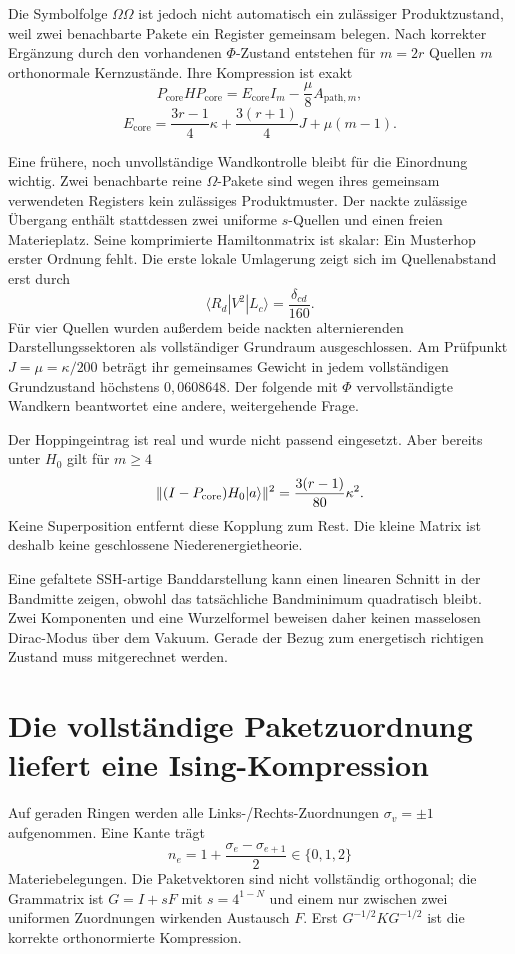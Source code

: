 Die Symbolfolge $\Omega\Omega$ ist jedoch nicht automatisch ein zulässiger Produktzustand, weil zwei benachbarte Pakete ein Register gemeinsam belegen. Nach korrekter Ergänzung durch den vorhandenen $\Phi$-Zustand entstehen für $m=2r$ Quellen $m$ orthonormale Kernzustände. Ihre Kompression ist exakt
\[
 P_{\mathrm{core}}HP_{\mathrm{core}}
 =E_{\mathrm{core}}I_m-\frac\mu8A_{\mathrm{path},m},
\]
\[
 E_{\mathrm{core}}=\frac{3r-1}{4}\kappa+\frac{3(r+1)}4J+\mu(m-1).
\]

Eine frühere, noch unvollständige Wandkontrolle bleibt für die Einordnung wichtig. Zwei benachbarte reine $\Omega$-Pakete sind wegen ihres gemeinsam verwendeten Registers kein zulässiges Produktmuster. Der nackte zulässige Übergang enthält stattdessen zwei uniforme $s$-Quellen und einen freien Materieplatz. Seine komprimierte Hamiltonmatrix ist skalar: Ein Musterhop erster Ordnung fehlt. Die erste lokale Umlagerung zeigt sich im Quellenabstand erst durch
\[
 \langle R_d|V^2|L_c\rangle=\frac{\delta_{cd}}{160}.
\]
Für vier Quellen wurden außerdem beide nackten alternierenden Darstellungssektoren als vollständiger Grundraum ausgeschlossen. Am Prüfpunkt $J=\mu=\kappa/200$ beträgt ihr gemeinsames Gewicht in jedem vollständigen Grundzustand höchstens $0{,}0608648$. Der folgende mit $\Phi$ vervollständigte Wandkern beantwortet eine andere, weitergehende Frage. 

Der Hoppingeintrag ist real und wurde nicht passend eingesetzt. Aber bereits unter $H_0$ gilt für $m\ge4$
\[
 \|(I-P_{\mathrm{core}})H_0\lvert a\rangle\|^2
 =\frac{3(r-1)}{80}\kappa^2.
\]
Keine Superposition entfernt diese Kopplung zum Rest. Die kleine Matrix ist deshalb keine geschlossene Niederenergietheorie. 

Eine gefaltete SSH-artige Banddarstellung kann einen linearen Schnitt in der Bandmitte zeigen, obwohl das tatsächliche Bandminimum quadratisch bleibt. Zwei Komponenten und eine Wurzelformel beweisen daher keinen masselosen Dirac-Modus über dem Vakuum. Gerade der Bezug zum energetisch richtigen Zustand muss mitgerechnet werden.

\section{Die vollständige Paketzuordnung liefert eine Ising-Kompression}
Auf geraden Ringen werden alle Links-/Rechts-Zuordnungen $\sigma_v=\pm1$ aufgenommen. Eine Kante trägt
\[
 n_e=1+\frac{\sigma_e-\sigma_{e+1}}2\in\{0,1,2\}
\]
Materiebelegungen. Die Paketvektoren sind nicht vollständig orthogonal; die Grammatrix ist $G=I+sF$ mit $s=4^{1-N}$ und einem nur zwischen zwei uniformen Zuordnungen wirkenden Austausch $F$. Erst $G^{-1/2}KG^{-1/2}$ ist die korrekte orthonormierte Kompression. 

